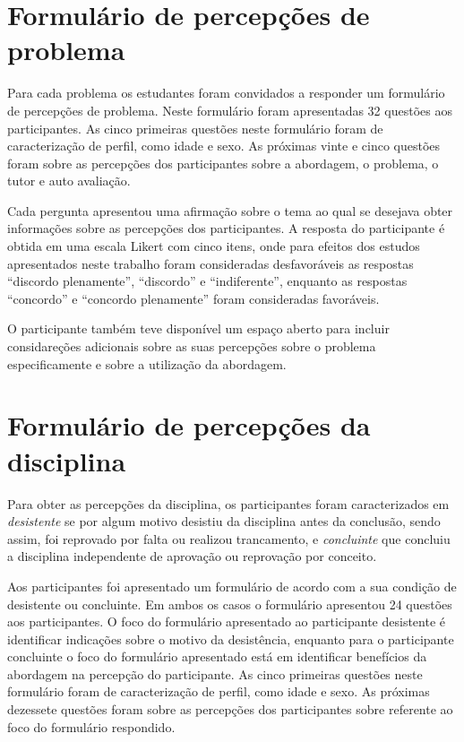 \acresetall
\section{Formulário de percepções de problema}
Para cada problema os estudantes foram convidados a responder um formulário de percepções de problema.
Neste formulário foram apresentadas 32 questões aos participantes.
As cinco primeiras questões neste formulário foram de caracterização de perfil, como
idade e sexo.
As próximas vinte e cinco questões foram sobre as percepções dos participantes sobre a abordagem, o
problema, o tutor e auto avaliação.

Cada pergunta apresentou uma afirmação sobre o tema ao qual se desejava obter informações sobre as
percepções dos participantes.
A resposta do participante é obtida em uma escala Likert com cinco itens, onde para efeitos dos estudos
apresentados neste trabalho foram consideradas desfavoráveis
as respostas ``discordo plenamente'', ``discordo'' e ``indiferente'', enquanto as
respostas ``concordo'' e ``concordo plenamente'' foram consideradas favoráveis.

O participante também teve disponível um espaço aberto para incluir considareções adicionais sobre
as suas percepções sobre o problema especificamente e sobre a utilização da abordagem.

\section{Formulário de percepções da disciplina}
Para obter as percepções da disciplina, os participantes foram caracterizados em \textit{desistente}
se por algum motivo desistiu da disciplina antes da conclusão, sendo assim, foi reprovado por
falta ou realizou trancamento, e \textit{concluinte} que concluiu a disciplina independente
de aprovação ou reprovação por conceito.

Aos participantes foi apresentado um formulário de acordo com a sua condição de desistente
ou concluinte.
Em ambos os casos o formulário apresentou 24 questões aos participantes.
O foco do formulário apresentado ao participante desistente é identificar indicações
sobre o motivo da desistência, enquanto para o participante concluinte o foco do
formulário apresentado está em identificar benefícios da abordagem na percepção
do participante.
As cinco primeiras questões neste formulário foram de caracterização de perfil, como
idade e sexo.
As próximas dezessete questões foram sobre as percepções dos participantes sobre referente
ao foco do formulário respondido.

